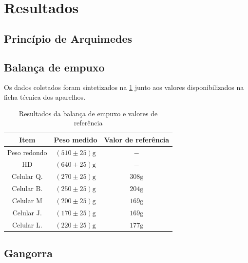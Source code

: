 \section{Resultados}
\subsection{Princípio de Arquimedes}


\subsection{Balança de empuxo}

Os dados coletados foram sintetizados na \cref{tab1} junto aos valores
disponibilizados na ficha técnica dos aparelhos.
\begin{table}[H]
    \caption{Resultados da balança de empuxo e valores de referência}
    \label{tab1}
    \begin{center}
        \begin{tabular}{c c c}
            \hline
            Item & Peso medido & Valor de referência\\
            \hline
            Peso redondo & \( (510 \pm 25) \unit{\gram} \) & \( - \) \\
            HD & \( (640 \pm 25) \unit{\gram} \) & \( - \) \\
            Celular Q. & \( (270 \pm 25) \unit{\gram} \) & \( 308 \unit{\gram} \) \\
            Celular B. & \( (250 \pm 25) \unit{\gram} \) & \( 204 \unit{\gram} \) \\
            Celular M & \( (200 \pm 25) \unit{\gram} \) & \( 169 \unit{\gram} \) \\
            Celular J. & \( (170 \pm 25) \unit{\gram} \) & \( 169 \unit{\gram} \) \\
            Celular L. & \( (220 \pm 25) \unit{\gram} \) & \( 177 \unit{\gram} \) \\
            \hline
    \end{tabular}
    \end{center}
\end{table}

\subsection{Gangorra}


